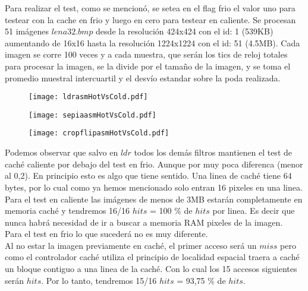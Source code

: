 Para realizar el test, como se mencionó, se setea en el flag frio el valor uno para testear con la cache en frio y luego en cero para testear en caliente.
Se procesan 51 imágenes $lena32.bmp$ desde la resolución 424x424 con el id: 1 (539KB) aumentando de 16x16 hasta la resolución 1224x1224 con el id: 51 (4.5MB). Cada imagen se corre 100 veces y a cada muestra, que serán los tics de reloj totales para procesar la imagen, se la divide por el tamaño de la imagen, y se toma el promedio muestral intercuartil y el desvío estandar sobre la poda realizada.

\begin{figure}[h]
  \begin{center}
	\texttt{[image: ldrasmHotVsCold.pdf]}
  \end{center}
\end{figure}

\begin{figure}[h]
  \begin{center}
	\texttt{[image: sepiaasmHotVsCold.pdf]}
  \end{center}
\end{figure}

\begin{figure}[h]
  \begin{center}
	\texttt{[image: cropflipasmHotVsCold.pdf]}
  \end{center}
\end{figure}

Podemos observar que salvo en $ldr$ todos los demás filtros mantienen el test de caché caliente por debajo del test en frio. Aunque por muy poca diferenca (menor al 0,2).
En principio esto es algo que tiene sentido. Una linea de caché tiene 64 bytes, por lo cual como ya hemos mencionado solo entran 16 pixeles en una linea. \\

Para el test en caliente las imágenes de menos de 3MB estarán completamente en memoria caché y tendremos 16/16 $hits$ = 100 $\%$ de $hits$ por linea. Es decir que nunca habrá necesidad de ir a buscar a memoria RAM pixeles de la imagen.\\ 
Para el test en frio lo que sucederá no es muy diferente. \\

Al no estar la imagen previamente en caché, el primer acceso será un $miss$ pero como el controlador caché utiliza el principio de localidad espacial traera a caché un bloque contiguo a una linea de la caché. Con lo cual los 15 accesos siguientes serán $hits$. Por lo tanto, tendremos 15/16 $hits$ = 93,75 $\%$ de $hits$. \\

